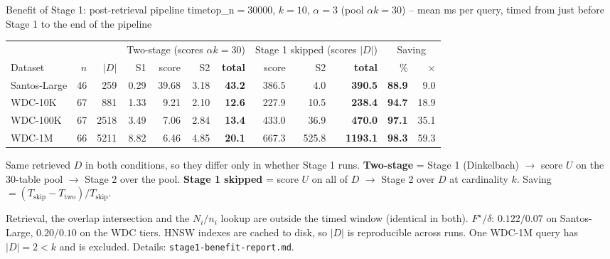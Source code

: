 \documentclass[aspectratio=169,10pt]{beamer}
\newcommand{\highlight}[1]{{\color{Cat1}\bfseries #1}}
\begin{document}
\begin{frame}{Benefit of Stage 1: post-retrieval pipeline time}{top\_n$=30000$, $k{=}10$, $\alpha{=}3$ (pool $\alpha k{=}30$) -- mean ms per query, timed from just before Stage 1 to the end of the pipeline}
\footnotesize
\begin{center}
\setlength{\tabcolsep}{3pt}
\begin{tabular}{lrr rrrr rrr rr}
\toprule
& & & \multicolumn{4}{c}{Two-stage (scores $\alpha k{=}30$)} & \multicolumn{3}{c}{Stage 1 skipped (scores $|D|$)} & \multicolumn{2}{c}{Saving} \\
\cmidrule(lr){4-7}\cmidrule(lr){8-10}\cmidrule(lr){11-12}
Dataset & $n$ & $|D|$ & S1 & score & S2 & \textbf{total} & score & S2 & \textbf{total} & \% & $\times$ \\
\midrule
Santos-Large & 46 & 259 & 0.29 & 39.68 & 3.18 & \textbf{43.2} & 386.5 & 4.0 & \textbf{390.5} & \textbf{88.9} & 9.0 \\
WDC-10K & 67 & 881 & 1.33 & 9.21 & 2.10 & \textbf{12.6} & 227.9 & 10.5 & \textbf{238.4} & \textbf{94.7} & 18.9 \\
WDC-100K & 67 & 2518 & 3.49 & 7.06 & 2.84 & \textbf{13.4} & 433.0 & 36.9 & \textbf{470.0} & \textbf{97.1} & 35.1 \\
WDC-1M & 66 & 5211 & 8.82 & 6.46 & 4.85 & \textbf{20.1} & 667.3 & 525.8 & \textbf{1193.1} & \textbf{98.3} & 59.3 \\
\bottomrule
\end{tabular}
\end{center}
\vspace{3pt}
\footnotesize
Same retrieved $D$ in both conditions, so they differ only in whether Stage 1 runs. \highlight{Two-stage} = Stage 1 (Dinkelbach) $\to$ score $U$ on the 30-table pool $\to$ Stage 2 over the pool. \highlight{Stage 1 skipped} = score $U$ on all of $D$ $\to$ Stage 2 over $D$ at cardinality $k$. Saving $=(T_{\text{skip}}-T_{\text{two}})/T_{\text{skip}}$.

\vspace{1pt}
{\footnotesize\color{Muted} Retrieval, the overlap intersection and the $N_i/n_i$ lookup are outside the timed window (identical in both). $F^\star/\delta$: $0.122/0.07$ on Santos-Large, $0.20/0.10$ on the WDC tiers. HNSW indexes are cached to disk, so $|D|$ is reproducible across runs. One WDC-1M query has $|D|{=}2<k$ and is excluded. Details: \texttt{stage1-benefit-report.md}.}
\end{frame}
\end{document}
